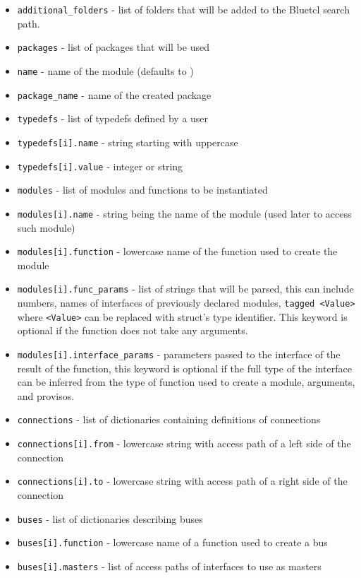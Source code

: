 \documentclass[12pt]{report}
\begin{document}
\begin{itemize} 
   \item \verb!additional_folders! - list of folders that will be added to the Bluetcl search path. 
   \item \verb!packages! - list of packages that will be used 
   \item \verb!name! - name of the module (defaults to ) 
   \item \verb!package_name! - name of the created package 
   \item \verb!typedefs! - list of typedefs defined by a user 
   \item \verb!typedefs[i].name! - string starting with uppercase 
   \item \verb!typedefs[i].value! - integer or string
   \item \verb!modules! - list of modules and functions to be instantiated 
   \item \verb!modules[i].name! - string being the name of the module (used later to access such module) 
   \item \verb!modules[i].function! - lowercase name of the function used to create the module 
   \item \verb!modules[i].func_params! - list of strings that will be parsed, this can include numbers, names of interfaces of previously declared modules, \verb!tagged <Value>! where \verb!<Value>! can be replaced with struct's type identifier. This keyword is optional if the function does not take any arguments. 
   \item \verb!modules[i].interface_params! - parameters passed to the interface of the result of the function, this keyword is optional if the full type of the interface can be inferred from the type of function used to create a module, arguments, and provisos. 
   \item \verb!connections! - list of dictionaries containing definitions of connections 
   \item \verb!connections[i].from! - lowercase string with access path of a left side of the connection 
   \item \verb!connections[i].to! - lowercase string with access path of a right side of the connection  
   \item \verb!buses! - list of dictionaries describing buses 
   \item \verb!buses[i].function! - lowercase name of a function used to create a bus 
   \item \verb!buses[i].masters! - list of access paths of interfaces to use as masters 

\end{itemize}
\end{document}
